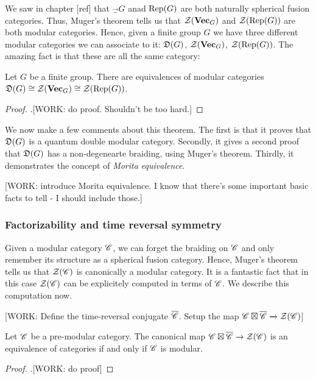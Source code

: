 We saw in chapter [ref] that $\Vec_G$ anad $\operatorname{Rep}(G)$ are both naturally spherical fusion categories. Thus, Muger's theorem tells us that $\mathcal{Z}(\mathbf{Vec}_G)$ and $\mathcal{Z}(\operatorname{Rep}(G))$ are both modular categories. Hence, given a finite group $G$ we have three different modular categories we can associate to it: $\mathfrak{D}(G)$, $\mathcal{Z}(\mathbf{Vec}_G)$, $\mathcal{Z}(\operatorname{Rep}(G))$. The amazing fact is that these are all the same category:

\begin{proposition} Let $G$ be a finite group. There are equivalences of modular categories $\mathfrak{D}(G)\cong \mathcal{Z}(\mathbf{Vec}_G)\cong \mathcal{Z}(\operatorname{Rep}(G))$.
\end{proposition}
\begin{proof}.[WORK: do proof. Shouldn't be too hard.]
\end{proof}

We now make a few comments about this theorem. The first is that it proves that $\mathfrak{D}(G)$ is a quantum double modular category. Secondly, it gives a second proof that $\mathfrak{D}(G)$ has a non-degenearte braiding, using Muger's theorem. Thirdly, it demonstrates the concept of \textit{Morita equivalence}.

[WORK: introduce Morita equivalence. I know that there's some important basic facts to tell - I should include those.]

\subsubsection{Factorizability and time reversal symmetry}

Given a modular category $\mathscr{C}$, we can forget the braiding on $\mathscr{C}$ and only remember its structure as a spherical fusion category. Hence, Muger's theorem tells us that $\mathcal{Z}(\mathscr{C})$ is canonically a modular category. It is a fantastic fact that in this case $\mathcal{Z}(\mathscr{C})$ can be explicitely computed in terms of $\mathscr{C}$. We describe this computation now.

[WORK: Define the time-reversal conjugate $\overline{\mathscr{C}}$. Setup the map $\mathscr{C}\boxtimes \overline{\mathscr{C}}\xrightarrow{}\mathcal{Z}(\mathscr{C})$]

\begin{proposition} Let $\mathscr{C}$ be a pre-modular category. The canonical map $\mathscr{C}\boxtimes \overline{\mathscr{C}}\xrightarrow{}\mathcal{Z}(\mathscr{C})$ is an equivalence of categories if and only if $\mathscr{C}$ is modular.
\end{proposition}
\begin{proof}.[WORK: do proof]
\end{proof}

